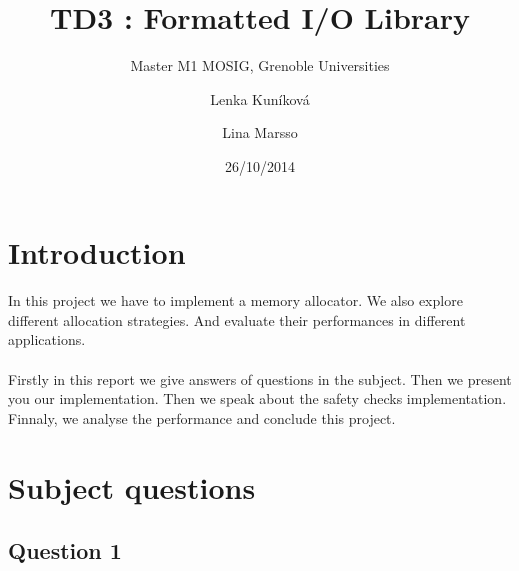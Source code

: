 \documentclass[a4paper,10pt]{article}
\title{TD3 : Formatted I/O Library}
\subtitle{Master M1 MOSIG, Grenoble Universities}
\author{Lenka Kun\'{i}kov\'{a} \and Lina Marsso}
\date{26/10/2014}
\begin{document}


\maketitle



\section{Introduction}
	\paragraph{}
	In this project we have to implement a memory allocator. 
	We also explore different allocation strategies.
	And evaluate their performances in different applications.
	\paragraph{}
	Firstly in this report we give answers of questions in the subject. 
	Then we present you our implementation.
	Then we speak about the safety checks implementation. 
	Finnaly, we analyse the performance and conclude this project.

\section{Subject questions}
\subsection{Question 1}
\end{document}
